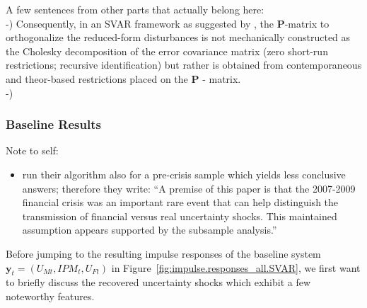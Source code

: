 \documentclass[a4paper,11pt,listof=nochaptergap,oneside,pointednumbers,bibtotoc,bigheadings,liststotoc]{scrbook}
\theoremstyle{mysatz}
\theoremstyle{mydefinition}
\theoremstyle{mybemerkung}
\renewcommand*{\paragraph}[1]{\subsubsection*{#1} \vspace{-3mm}} %
\newcommand{\vect}[1]{\boldsymbol{\mathbf{#1}}}
\begin{document}
\begin{itemize}
A few sentences from other parts that actually belong here:\\
-) Consequently, in an SVAR framework as suggested by \citet{ludvigsonetal:18}, the $\vect{P}$-matrix to orthogonalize the reduced-form disturbances is not mechanically constructed as the Cholesky decomposition of the error covariance matrix (zero short-run restrictions; recursive identification) but rather is obtained from contemporaneous and theor-based restrictions placed on the $\vect{P}$ - matrix.\\
-) 

\paragraph{Baseline Results}

\begingroup
    \fontsize{8pt}{12pt}\selectfont
    Note to self:
\begin{itemize}
	\item \citet[p. 25]{ludvigsonetal:18} run their algorithm also for a pre-crisis sample which yields less conclusive answers; therefore they write: ``A premise of this paper is that the 2007-2009 financial crisis was an important rare event that can help distinguish the transmission of financial versus real uncertainty shocks. This maintained assumption appears supported by the subsample analysis.''
\end{itemize}
\endgroup

Before jumping to the resulting impulse responses of the baseline system $\vect{y}_t = (U_{Mt}, IPM_{t}, U_{Ft})$ in Figure~\ref{fig:impulse.responses_all.SVAR}, we first want to briefly discuss the recovered uncertainty shocks which exhibit a few noteworthy features. \\
\\



\end{itemize}
\end{document}
